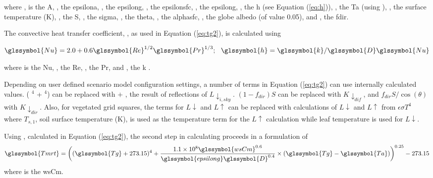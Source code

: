 \documentclass[final,3p,times,authoryear]{elsarticle}
\begin{document}
where , is the \glsdesc{A},
, the \glsdesc{epsilona}, 
, the \glsdesc{epsilong}, 
, the \glsdesc{epsilonsfc}, 
, the \glsdesc{epsilong}, 
, the \glsdesc{h} (see Equation (\ref{eq:h})), 
, the \glsdesc{Ta} (using ), 
, the surface temperature (K), 
, the \glsdesc{S}, 
, the \glsdesc{sigma}, 
, the \glsdesc{theta}, 
, the \glsdesc{alphasfc},  
, the globe albedo (of value 0.05), and 
, the \glsdesc{fdir}. 




The convective heat transfer coefficient, , as used in Equation (\ref{eq:tg2}), is calculated using 

\begin{equation}\label{eq:h}
\glssymbol{Nu} = 2.0 + 0.6\glssymbol{Re}^{1/2}\glssymbol{Pr}^{1/3};  ~~\glssymbol{h} = \glssymbol{k} / \glssymbol{D} \glssymbol{Nu}
\end{equation}

where  is the \glsdesc{Nu},
, the \glsdesc{Re},
, the \glsdesc{Pr}, and 
, the \glsdesc{k} \citep{Liljegren2008}.



Depending on user defined scenario model configuration settings, a number of terms in Equation (\ref{eq:tg2}) can use internally calculated values.  ( $^{4}$ +  $^{4}$) can be replaced with  $+$ , the result of reflections of $L \downarrow_{i,sky}$. $(1-f_{dir})S$ can be replaced with $K \downarrow_{dif}$, and $f_{dir}S/ \cos(\theta)$ with $K \downarrow_{dir}$. Also, for vegetated grid squares, the terms for $L\downarrow$ and $L\uparrow$ can be replaced with calculations of $L\downarrow$ and $L\uparrow$ from $\epsilon \sigma T^{4}$ where $T_{s,1}$, soil surface temperature (K), is used as the temperature term for the $L\uparrow$ calculation while leaf temperature is used for $L\downarrow$. 

Using , calculated in Equation (\ref{eq:tg2}), the second step in calculating  proceeds in a formulation of \cite{Kantor2011} 
\begin{equation}\label{eq:tmrtbucket}
  \glssymbol{Tmrt} = 
  \bigg(
   (\glssymbol{Tg}+273.15)^{4} + 
    \frac{1.1 \times 10^{8}  \glssymbol{wsCm}^{0.6}}{\glssymbol{epsilong}  \glssymbol{D}^{0.4}}
    \times 
     (\glssymbol{Tg}-\glssymbol{Ta})
    \bigg)^{0.25} - 273.15
\end{equation}
 where  is the \glsdesc{wsCm}.
\end{document}
